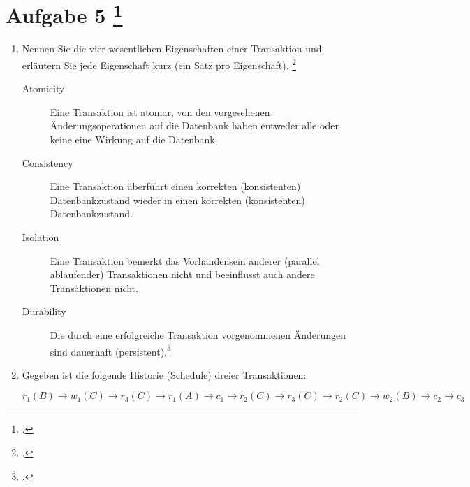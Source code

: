 \documentclass{bschlangaul-aufgabe}
\begin{document}

\section{Aufgabe 5
\footcite[Aufgabe 1: Transaktionen, Schedules]{db:pu:5}}

\begin{enumerate}


\item Nennen Sie die vier wesentlichen Eigenschaften einer
Transaktion und erläutern Sie jede Eigenschaft kurz (ein Satz pro
Eigenschaft).
\footcite[Thema 1 Teilaufgabe 1 Aufgabe 5]{examen:46116:2016:03}

\begin{bAntwort}
\begin{description}
\item[Atomicity]

Eine Transaktion ist atomar, \dh von den vorgesehenen
Änderungsoperationen auf die Datenbank haben entweder alle oder keine
eine Wirkung auf die Datenbank.

\item[Consistency]

Eine Transaktion überführt einen korrekten (konsistenten)
Datenbankzustand wieder in einen korrekten (konsistenten)
Datenbankzustand.

\item[Isolation]

Eine Transaktion bemerkt das Vorhandensein anderer (parallel
ablaufender) Transaktionen nicht und beeinflusst auch andere
Transaktionen nicht.

\item[Durability]

Die durch eine erfolgreiche Transaktion vorgenommenen Änderungen sind
dauerhaft (persistent).\footcite[Kapitel 9.5 „Eigenschaften von Transaktionen“, Seite 305]{kemper}
\end{description}
\end{bAntwort}


\item Gegeben ist die folgende Historie (Schedule) dreier Transaktionen:

\bigskip

$
r_1 (B) \rightarrow
w_1 (C) \rightarrow
r_3 (C) \rightarrow
r_1 (A) \rightarrow
c_1 \rightarrow
r_2 (C) \rightarrow
r_3 (C) \rightarrow
r_2 (C) \rightarrow
w_2 (B) \rightarrow
c_2 \rightarrow
c_3
$


\end{enumerate}
\end{document}
